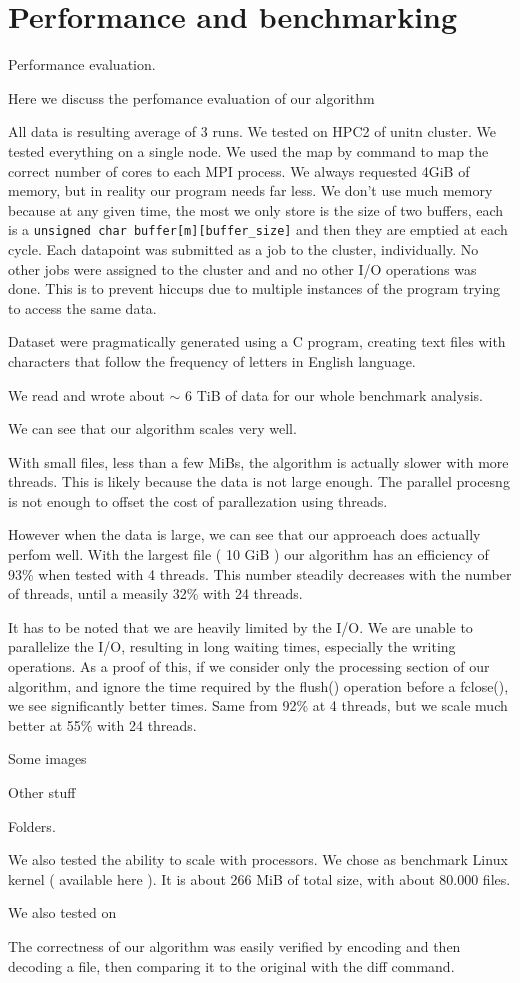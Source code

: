 \section{Performance and benchmarking}
Performance evaluation.

Here we discuss the perfomance evaluation of our algorithm


All data is resulting average of 3 runs.
We tested on HPC2 of unitn cluster.
We tested everything on a single  node. We used the map by command to map the correct number of cores to each MPI process.
We always requested 4GiB of memory, but in reality our program needs far less.
We don't use much memory because at any given time, the most we only store is the size of two buffers, each is a \verb|unsigned char buffer[m][buffer_size]| and then they are emptied at each cycle.
Each datapoint was submitted as a job to the cluster, individually. No other jobs were assigned to the cluster and and no other I/O operations was done. This is to prevent hiccups due to multiple instances of the program trying to access the same data.

Dataset were pragmatically generated using a C program, creating text files with characters that follow the frequency of letters in English language.

We read and wrote about $\sim$ 6 TiB of data for our whole benchmark analysis.

We can see that our algorithm scales very well. 

With small files, less than a few MiBs, the algorithm is actually slower with more threads. This is likely because the data is not large enough. The parallel procesng is not enough to offset the cost of parallezation using threads.

However when the data is large, we can see that our approeach does actually perfom well. With the largest file ( 10 GiB ) our algorithm has an efficiency of 93\% when tested with 4 threads. This number steadily decreases with the number of threads, until a measily 32\% with 24 threads. 

It has to be noted that we are heavily limited by the I/O. We are unable to parallelize the I/O, resulting in long waiting times, especially the writing operations. As a proof of this, if we consider only the processing section of our algorithm, and ignore the time required by the flush() operation before a fclose(), we see significantly better times. Same from 92\% at 4 threads, but we scale much better at 55\% with 24 threads. 

Some images

Other stuff

Folders.

We also tested the ability to scale with processors. We chose as benchmark Linux kernel ( available here ). It is about 266 MiB of total size, with about 80.000 files.


We also tested on


The correctness of our algorithm was easily verified by encoding and then decoding a file, then comparing it to the original with the diff command.